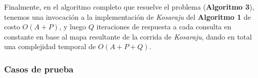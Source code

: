 Finalmente, en el algoritmo completo que resuelve el problema (\textbf{Algoritmo 3}), tenemos una invocación a la implementación de \textit{Kosaraju} del \textbf{Algoritmo 1} de costo $O(A+P)$, y luego $Q$ iteraciones de respuesta a cada consulta en constante en base al mapa resultante de la corrida de \textit{Kosaraju}, dando en total una complejidad temporal de $O(A+P+Q)$.

\subsubsection{Casos de prueba}

